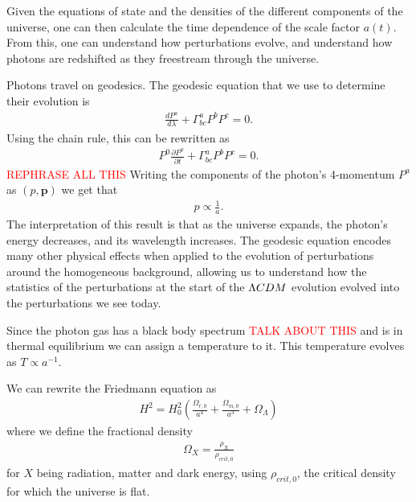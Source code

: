     Given the equations of state and the densities of the different
    components of the universe, one can then calculate the time dependence of the
    scale factor $a(t)$. From this, one can understand how perturbations evolve, and understand
    how photons are redshifted as they freestream through the universe.


    Photons travel on geodesics. The geodesic equation that we use to determine
    their evolution is
    \begin{align}
        \frac{dP^a}{d\lambda}+\Gamma^a_{bc}P^bP^c=0.
    \end{align}
    Using the chain rule, this can be rewritten as
    \begin{align}
        P^{0}\frac{\partial P^a}{\partial t}+\Gamma^a_{bc}P^bP^c=0.
    \end{align}
    \textcolor{red}{REPHRASE ALL THIS}
    Writing the components of the photon's 4-momentum $P^a$
    as $(p, \mathbf{p})$ we get that
    \begin{align}
        p\propto \frac{1}{a}.
    \end{align}
    The interpretation of this result is that as the universe expands,
    the photon's energy decreases, and its wavelength increases.
    The geodesic equation encodes many other physical effects when applied
    to the evolution of perturbations around the homogeneous background,
    allowing us to understand how the statistics of the perturbations at the
    start of the $\Lambda CDM$ evolution evolved into the perturbations we see today.


    Since the photon gas has a black body spectrum \textcolor{red}{TALK ABOUT THIS}
    and is in thermal equilibrium we can assign a temperature to it.
    This temperature evolves as $T\propto a^{-1}$.


    We can rewrite the Friedmann equation as
    \begin{align}\label{friedmann_omega}
        H^2 = H_0^2\left(\frac{\Omega_{r,0}}{a^4}+\frac{\Omega_{m,0}}{a^3}+\Omega_{\Lambda}\right)
    \end{align}
    where we define the fractional density
    \begin{align}
        \Omega_{X} = \frac{\rho_X}{\rho_{crit,0}}
    \end{align}
    for $X$ being radiation, matter and dark energy, using $\rho_{crit,0}$, the critical density for which the universe is flat.


